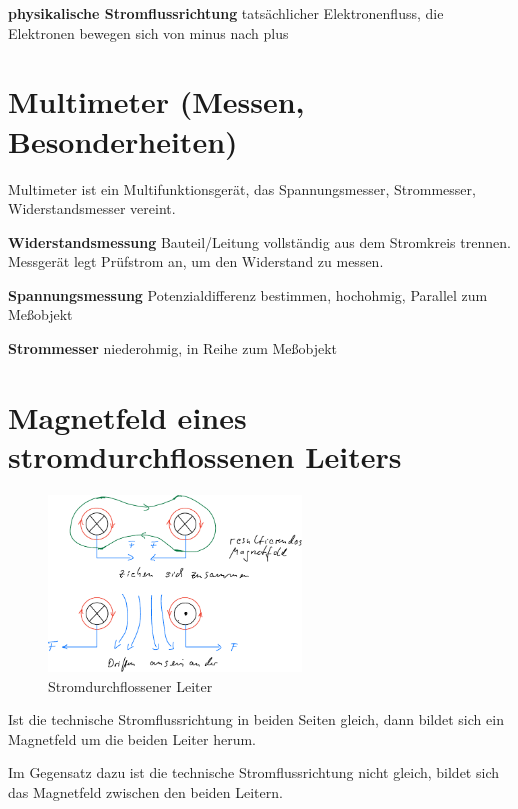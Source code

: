 \textbf{physikalische Stromflussrichtung} tatsächlicher Elektronenfluss,
die Elektronen bewegen sich von minus nach plus

\section{Multimeter (Messen,
Besonderheiten)}\label{multimeter-messen-besonderheiten}

Multimeter ist ein Multifunktionsgerät, das Spannungsmesser,
Strommesser, Widerstandsmesser vereint.

\textbf{Widerstandsmessung} Bauteil/Leitung vollständig aus dem
Stromkreis trennen. Messgerät legt Prüfstrom an, um den Widerstand zu
messen.

\textbf{Spannungsmessung} Potenzialdifferenz bestimmen, hochohmig,
Parallel zum Meßobjekt

\textbf{Strommesser} niederohmig, in Reihe zum Meßobjekt

\newpage

\section{Magnetfeld eines stromdurchflossenen
Leiters}\label{magnetfeld-eines-stromdurchflossenen-leiters}

\begin{figure}[!ht]%
\centering
\includegraphics[width=0.6\textwidth]{images/Skizze/05_StromdurchflossenerLeiter_Skizze.pdf}
\caption{Stromdurchflossener Leiter}
\end{figure}

Ist die technische Stromflussrichtung in beiden Seiten gleich, dann
bildet sich ein Magnetfeld um die beiden Leiter herum.

Im Gegensatz dazu ist die technische Stromflussrichtung nicht gleich,
bildet sich das Magnetfeld zwischen den beiden Leitern.

\newpage

